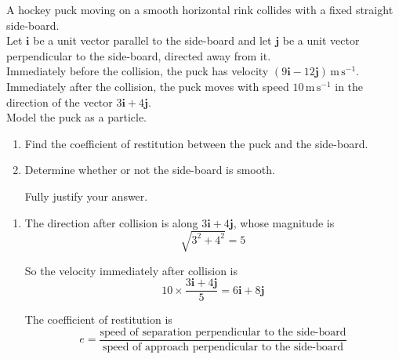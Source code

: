 \documentclass[leqno]{article}
\begin{document}
\djsFrontMatter
\begin{enumerate}[
  label=\textbf{\arabic*.},
  leftmargin=*,
  topsep=0pt,
  partopsep=0pt,
  parsep=0pt
]

\questionitem

A hockey puck moving on a smooth horizontal rink collides with a fixed straight side-board. \\
Let $\mathbf{i}$ be a unit vector parallel to the side-board and let $\mathbf{j}$ be a unit vector perpendicular to the side-board, directed away from it. \\

Immediately before the collision, the puck has velocity $(9\mathbf{i}-12\mathbf{j})\,\mathrm{m\,s^{-1}}$. \\

Immediately after the collision, the puck moves with speed $10\,\mathrm{m\,s^{-1}}$ in the direction of the vector $3\mathbf{i}+4\mathbf{j}$. \\

Model the puck as a particle. \\

\begin{enumerate}[label=\textbf{(\alph*)}]
  \item Find the coefficient of restitution between the puck and the side-board.  \\
  \item Determine whether or not the side-board is smooth.

  Fully justify your answer.  \\
\end{enumerate}

\vspace*{10pt}

\begin{djsSolution}
\begin{enumerate}[label=\textbf{(\alph*)}]
  \item The direction after collision is along $3\mathbf{i}+4\mathbf{j}$, whose magnitude is
\[
\sqrt{3^2+4^2}=5
\]

So the velocity immediately after collision is
\[
10\times \frac{3\mathbf{i}+4\mathbf{j}}{5}=6\mathbf{i}+8\mathbf{j}
\]

The coefficient of restitution is
\[
e=\dfrac{\text{speed of separation perpendicular to the side-board}}{\text{speed of approach perpendicular to the side-board}}
\]


\end{enumerate}
\end{djsSolution}
\end{enumerate}
\end{document}
